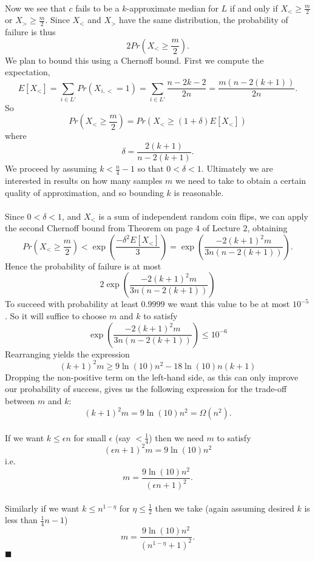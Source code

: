 \documentclass[letterpaper,12pt,oneside,onecolumn]{article}
\begin{document}
\paragraph{}
Now we see that $c$ fails to be a $k$-approximate median for $L$ if and only if $X_< \geq \frac{m}{2}$ or $X_> \geq \frac{m}{2}$. Since $X_<$ and $X_>$ have the same distribution, the probability of failure is thus
$$2Pr(X_< \geq \frac{m}{2}).$$
We plan to bound this using a Chernoff bound. First we compute the expectation,
$$E[X_<] = \sum_{i\in L'} Pr(X_{i,<} = 1)  = \sum_{i \in L'} \frac{n-2k-2}{2n} = \frac{m(n-2(k+1))}{2n}.$$
So 
$$Pr(X_< \geq \frac{m}{2}) = Pr(X_< \geq (1+\delta) E[X_<])$$
where $$\delta =\frac{2(k+1)}{n-2(k+1)}.$$
We proceed by assuming $k < \frac{n}{4}-1$ so that $0<\delta <1$. Ultimately we are interested in results on how many samples $m$ we need to take to obtain a certain quality of approximation, and so bounding $k$ is reasonable.
\paragraph{}
Since $0 < \delta < 1$, and $X_<$ is a sum of independent random coin flips, we can apply the second Chernoff bound from Theorem on page $4$ of Lecture $2$, obtaining
$$Pr(X_< \geq \frac{m}{2}) < \exp(\frac{-\delta^2E[X_<]}{3}) = \exp(\frac{-2(k+1)^2m}{3n(n-2(k+1))}).$$
Hence the probability of failure is at most
$$2\exp(\frac{-2(k+1)^2m}{3n(n-2(k+1))})$$
To succeed with probability at least $0.9999$ we want this value to be at most $10^{-5}$. So it will suffice to choose $m$ and $k$ to satisfy
$$\exp(\frac{-2(k+1)^2m}{3n(n-2(k+1))}) \leq 10^{-6}$$
Rearranging yields the expression
$$(k+1)^2m \geq 9\ln(10) n^2 - 18\ln(10) n(k+1)$$
Dropping the non-positive term on the left-hand side, as this can only improve our probability of success, gives us the following expression for the trade-off between $m$ and $k$:
$$(k+1)^2m = 9\ln(10)n^2 = \Omega(n^2).$$
\paragraph{}
If we want $k \leq \epsilon n$ for small $\epsilon$ (say $<\frac{1}{4}$) then we need $m$ to satisfy
$$(\epsilon n+ 1)^2 m = 9\ln(10)n^2$$
i.e. 
$$m = \frac{9\ln(10)n^2}{(\epsilon n + 1)^2}.$$
\paragraph{}
Similarly if we want $k \leq n^{1-\eta}$ for $\eta \leq \frac{1}{2}$ then we take (again assuming desired $k$ is less than $\frac{1}{4}n-1$)
$$m =  \frac{9\ln(10)n^2}{(n^{1-\eta} + 1)^2}.$$
$\blacksquare$
\newpage
\end{document}

